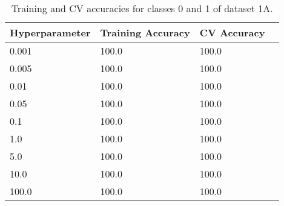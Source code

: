 \def\arraystretch{1.25}
\begin{table}[H]
{\small
\centering
\begin{tabular}{l l l c}
\hline
\hline
\textbf{Hyperparameter} & \textbf{Training Accuracy}  &  \textbf{CV Accuracy}\\
\hline
\hline
0.001 & 100.0 & 100.0\\
0.005 & 100.0 & 100.0\\
0.01 & 100.0 & 100.0\\
0.05 & 100.0 & 100.0\\
0.1 & 100.0 & 100.0\\
1.0 & 100.0 & 100.0\\
5.0 & 100.0 & 100.0\\
10.0 & 100.0 & 100.0\\
100.0 & 100.0 & 100.0\\
\hline
\end{tabular}
\caption{Training and CV accuracies for classes 0 and 1 of dataset 1A.}
}
\end{table}